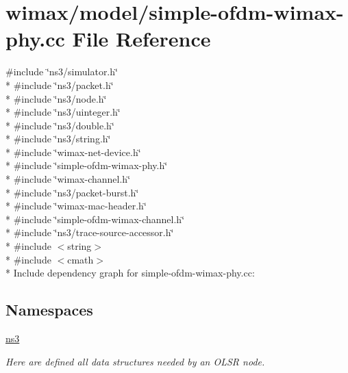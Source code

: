 \hypertarget{simple-ofdm-wimax-phy_8cc}{}\section{wimax/model/simple-\/ofdm-\/wimax-\/phy.cc File Reference}
\label{simple-ofdm-wimax-phy_8cc}
{\ttfamily \#include \char`\"{}ns3/simulator.\+h\char`\"{}}\\*
{\ttfamily \#include \char`\"{}ns3/packet.\+h\char`\"{}}\\*
{\ttfamily \#include \char`\"{}ns3/node.\+h\char`\"{}}\\*
{\ttfamily \#include \char`\"{}ns3/uinteger.\+h\char`\"{}}\\*
{\ttfamily \#include \char`\"{}ns3/double.\+h\char`\"{}}\\*
{\ttfamily \#include \char`\"{}ns3/string.\+h\char`\"{}}\\*
{\ttfamily \#include \char`\"{}wimax-\/net-\/device.\+h\char`\"{}}\\*
{\ttfamily \#include \char`\"{}simple-\/ofdm-\/wimax-\/phy.\+h\char`\"{}}\\*
{\ttfamily \#include \char`\"{}wimax-\/channel.\+h\char`\"{}}\\*
{\ttfamily \#include \char`\"{}ns3/packet-\/burst.\+h\char`\"{}}\\*
{\ttfamily \#include \char`\"{}wimax-\/mac-\/header.\+h\char`\"{}}\\*
{\ttfamily \#include \char`\"{}simple-\/ofdm-\/wimax-\/channel.\+h\char`\"{}}\\*
{\ttfamily \#include \char`\"{}ns3/trace-\/source-\/accessor.\+h\char`\"{}}\\*
{\ttfamily \#include $<$string$>$}\\*
{\ttfamily \#include $<$cmath$>$}\\*
Include dependency graph for simple-\/ofdm-\/wimax-\/phy.cc\+:
\subsection*{Namespaces}
\begin{DoxyCompactItemize}
\item 
 \hyperlink{namespacens3}{ns3}
\begin{DoxyCompactList}\small\item\em Here are defined all data structures needed by an O\+L\+SR node. \end{DoxyCompactList}\end{DoxyCompactItemize}
